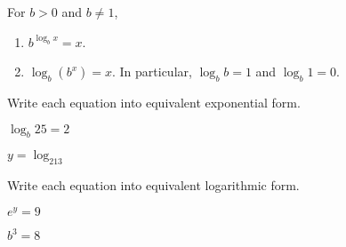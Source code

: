 \begin{tcolorbox}[colback=white,colframe=cyan, title filled=false, coltitle=cyan, enhanced, attach boxed title to top center={yshift=-3mm,yshifttext=-1mm}, fonttitle=\bfseries, boxed title style={size=small,colback=white},
title=Basic properties of logarithms
]
 For $b>0$ and $b\neq 1$,
\begin{enumerate}
\item $b^{\log_bx}=x$. 
\item $\log_b(b^x)=x$. In particular, $\log_bb=1$ and $\log_b1=0$.
\end{enumerate}
\end{tcolorbox}


\begin{exercise}
Write each equation into equivalent exponential form.\\

\noindent
\begin{enumerate*}[label=(\alph*)~~]
\item  $\log_b25=2$ \hspace{0.35\textwidth}
\item  $y=\log_213$
\end{enumerate*}
\end{exercise}
\vspace{2cm}


\iffalse
\begin{exercise}
Write each equation into equivalent exponential  form.\\

\noindent
\begin{enumerate*}[label=(\alph*)~~]
\item  $\log_37=y$ \hspace{0.35\textwidth}
\item  $3=\log_b64$
\end{enumerate*}
\end{exercise}
\fi


\begin{exercise}
Write each equation into equivalent logarithmic form.\\

\noindent
\begin{enumerate*}[label=(\alph*)~~]
\item  $e^y=9$ \hspace{0.4\textwidth}
\item  $b^3=8$
\end{enumerate*}
\end{exercise}
\vspace{2cm}


